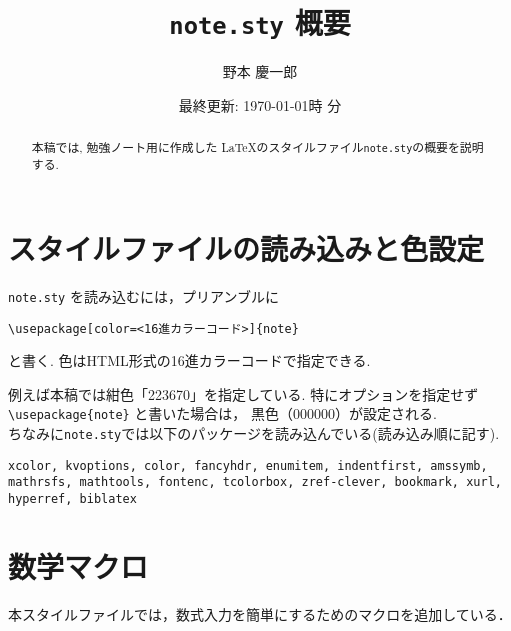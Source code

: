 \documentclass[
	paper=a4,
	fontsize=10pt, %
	jafontsize=12Q,
	jafontscale=0.92,
]{jlreq}
\title{\texttt{note.sty} 概要}
\author{野本 慶一郎}
\date{最終更新: \today \texthours 時 \textminutes 分 \clocktime}
\begin{document}
\maketitle
\newpage


\begin{abstract}
	本稿では, 勉強ノート用に作成した \LaTeX のスタイルファイル\texttt{note.sty}の概要を説明する.
	\lipsum[1-2]
\end{abstract}

\tableofcontents
\newpage

\section{スタイルファイルの読み込みと色設定}

\texttt{note.sty} を読み込むには，プリアンブルに
\begin{center}
  \verb|\usepackage[color=<16進カラーコード>]{note}|
\end{center}
と書く. 色はHTML形式の16進カラーコードで指定できる.

例えば本稿では紺色「223670」を指定している.
特にオプションを指定せず \verb|\usepackage{note}| と書いた場合は，
黒色（000000）が設定される.
\\

ちなみに\texttt{note.sty}では以下のパッケージを読み込んでいる(読み込み順に記す).
\begin{center}
	\texttt{xcolor, kvoptions, color, fancyhdr, enumitem, indentfirst, amssymb, mathrsfs, mathtools, fontenc, tcolorbox, zref-clever, bookmark, xurl, hyperref, biblatex}
\end{center}

\section{数学マクロ}

本スタイルファイルでは，数式入力を簡単にするためのマクロを追加している．
\end{document}
